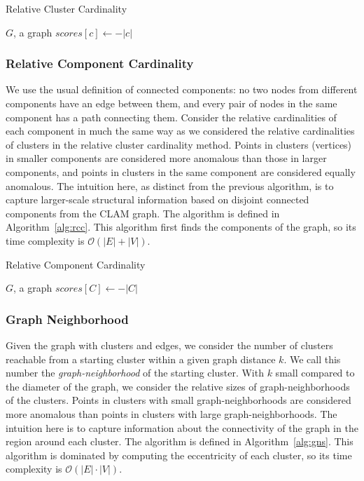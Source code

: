 \begin{algorithm}[h]
    \caption{Relative Cluster Cardinality}
    \label{alg:rclc}
\begin{algorithmic}[1]
    \REQUIRE $G$, a graph
    \STATE $scores[c] \gets -|c|$
    \ENDFOR
\end{algorithmic}
\end{algorithm}


\subsubsection{Relative Component Cardinality}
We use the usual definition of connected components:
no two nodes from different components have an edge between them, and
every pair of nodes in the same component has a path connecting them.
Consider the relative cardinalities of each component in much the same way as we considered the relative cardinalities of clusters in the relative cluster cardinality method.
Points in clusters (vertices) in smaller components are considered more anomalous than those in larger components,
and points in clusters in the same component are considered equally anomalous.
The intuition here, as distinct from the previous algorithm, is to capture larger-scale structural information based on disjoint connected components from the CLAM graph.
The algorithm is defined in Algorithm~\ref{alg:rcc}.
This algorithm first finds the components of the graph, so its time complexity is $\mathcal{O}(|E| + |V|)$.

\begin{algorithm}[h]
    \caption{Relative Component Cardinality}
    \label{alg:rcc}
\begin{algorithmic}[1]
    \REQUIRE $G$, a graph
        \STATE $scores[C] \gets -|C|$
    \ENDFOR
\end{algorithmic}
\end{algorithm}


\subsubsection{Graph Neighborhood}
Given the graph with clusters and edges, we consider the number of clusters reachable from a starting cluster within a given graph distance $k$.
We call this number the \textit{graph-neighborhood} of the starting cluster.
With $k$ small compared to the diameter of the graph, we consider the relative sizes of graph-neighborhoods of the clusters.
Points in clusters with small graph-neighborhoods are considered more anomalous than points in clusters with large graph-neighborhoods.
The intuition here is to capture information about the connectivity of the graph in the region around each cluster.
The algorithm is defined in Algorithm~\ref{alg:gns}.
This algorithm is dominated by computing the eccentricity of each cluster, so its time complexity is $\mathcal{O}(|E| \cdot |V|)$.

